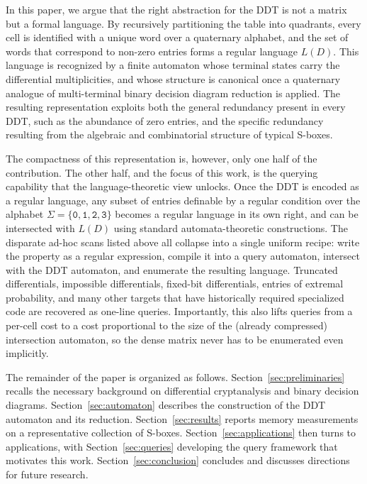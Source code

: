 In this paper, we argue that the right abstraction for the DDT is not a
matrix but a formal language. By recursively partitioning the table into
quadrants, every cell is identified with a unique word over a quaternary
alphabet, and the set of words that correspond to non-zero entries forms a
regular language $L(D)$. This language is recognized by a finite
automaton whose terminal states carry the differential multiplicities, and
whose structure is canonical once a quaternary analogue of multi-terminal
binary decision diagram reduction is applied. The resulting representation
exploits both the general redundancy present in every DDT, such as the
abundance of zero entries, and the specific redundancy resulting from the
algebraic and combinatorial structure of typical S-boxes.

The compactness of this representation is, however, only one half of the
contribution. The other half, and the focus of this work, is the querying
capability that the language-theoretic view unlocks. Once the DDT is
encoded as a regular language, any subset of entries definable by a regular
condition over the alphabet $\Sigma = \{\texttt{0},\texttt{1},\texttt{2},\texttt{3}\}$ becomes a regular
language in its own right, and can be intersected with $L(D)$ using
standard automata-theoretic constructions. The disparate ad-hoc scans
listed above all collapse into a single uniform recipe: write the property
as a regular expression, compile it into a query automaton, intersect with
the DDT automaton, and enumerate the resulting language. Truncated
differentials, impossible differentials, fixed-bit differentials, entries
of extremal probability, and many other targets that have historically
required specialized code are recovered as one-line queries. Importantly,
this also lifts queries from a per-cell cost to a cost proportional to the
size of the (already compressed) intersection automaton, so the dense
matrix never has to be enumerated even implicitly.

The remainder of the paper is organized as follows. Section~\ref{sec:preliminaries} recalls the
necessary background on differential cryptanalysis and binary decision
diagrams. Section~\ref{sec:automaton} describes the construction of the DDT automaton and
its reduction. Section~\ref{sec:results} reports memory measurements on a representative
collection of S-boxes. Section~\ref{sec:applications} then turns to applications, with
Section~\ref{sec:queries} developing the query framework that motivates this work.
Section~\ref{sec:conclusion} concludes and discusses directions for future research.

